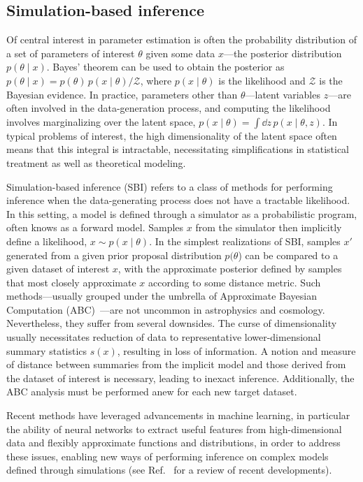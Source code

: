 \documentclass[prd,aps,10pt,nofootinbib,twocolumn,superscriptaddress,preprintnumbers,balancelastpage,longbibliography]{revtex4-1}
\begin{document}
\subsection{Simulation-based inference}

Of central interest in parameter estimation is often the probability distribution of a set of parameters of interest $\theta$ given some data $x$---the posterior distribution $p(\theta\mid x)$. Bayes' theorem can be used to obtain the posterior as $p(\theta\mid x) = p(\theta)\, p(x\mid\theta) / \mathcal Z$, where $p(x\mid\theta)$ is the likelihood and $\mathcal Z$ is the Bayesian evidence. In practice, parameters other than $\theta$---latent variables $z$---are often involved in the data-generation process, and computing the likelihood involves marginalizing over the latent space, $p(x\mid\theta) = \int \dd z\,p(x\mid\theta, z)$. In typical problems of interest, the high dimensionality of the latent space often means that this integral is intractable, necessitating simplifications in statistical treatment as well as theoretical modeling. 


Simulation-based inference (SBI) refers to a class of methods for performing inference when the data-generating process does not have a tractable likelihood. In this setting, a model is defined through a simulator as a probabilistic program, often knows as a forward model. Samples $x$ from the simulator then implicitly define a likelihood, $x\sim p(x\mid\theta)$. In the simplest realizations of SBI, samples $x'$ generated from a given prior proposal distribution $p(\theta$) can be compared to a given dataset of interest $x$, with the approximate posterior defined by samples that most closely approximate $x$ according to some distance metric. Such methods---usually grouped under the umbrella of Approximate Bayesian Computation (ABC)~\cite{10.1214/aos/1176346785}---are not uncommon in astrophysics and cosmology. Nevertheless, they suffer from several downsides. The curse of dimensionality usually necessitates reduction of data to representative lower-dimensional summary statistics $s(x)$, resulting in loss of information. A notion and measure of distance between summaries from the implicit model and those derived from the dataset of interest is necessary, leading to inexact inference. Additionally, the ABC analysis must be performed anew for each new target dataset.

Recent methods have leveraged advancements in machine learning, in particular the ability of neural networks to extract useful features from high-dimensional data and flexibly approximate functions and distributions, in order to address these issues, enabling new ways of performing inference on complex models defined through simulations (see Ref.~\cite{cranmer2020frontier} for a review of recent developments).
\end{document}
